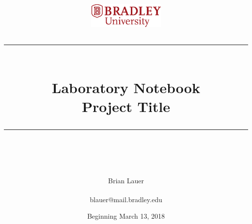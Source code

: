 \documentclass[fontsize=11pt, %
                             paper=letter, %
                             twoside, %
                             captions=tableheading,
                             index=totoc,
                             hyperref]{labbook}
\newcommand{\HRule}{\rule{\linewidth}{0.5mm}} %
\begin{document}


%

\title{
\begin{center}
\href{http://www.bradley.edu}{\includegraphics[height=0.5in]{figs/logoBU1-Print}}
\vskip10pt
\HRule \\[0.4cm]
{\Huge \bfseries Laboratory Notebook \\[0.5cm] \Large Project Title}\\[0.4cm] %
\HRule \\[1.5cm]
\end{center}
}
\author{\Huge Brian Lauer \\ \\ \LARGE blauer@mail.bradley.edu \\[2cm]} %
\date{Beginning March 13, 2018} %
\maketitle


\printindex
\tableofcontents %
\newpage %
\end{document}
